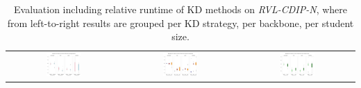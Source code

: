\begin{table}[h]
  \centering
  \caption{Evaluation including relative runtime of KD methods on \textit{RVL-CDIP-N}, where from left-to-right results are grouped per KD strategy, per backbone, per student size.}
  \label{tab:rvl_n}
  \begin{tabular}{ccc}
    \includegraphics[width=0.33\textwidth]{images/N_results_perKDapproach.png}               &
    \includegraphics[width=0.33\textwidth]{images/N_results_perbackboneincludingteacher.png} &
    \includegraphics[width=0.33\textwidth]{images/N_results_perstudentsizes.png}               \\
  \end{tabular}
\end{table}

